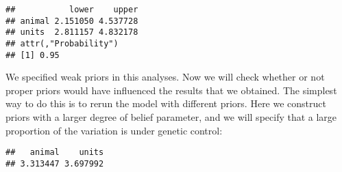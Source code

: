 \documentclass[
  12pt,
]{book}
\newenvironment{Shaded}{\begin{snugshade}}{\end{snugshade}}
\newcommand{\AttributeTok}[1]{\textcolor[rgb]{0.77,0.63,0.00}{#1}}
\newcommand{\ConstantTok}[1]{\textcolor[rgb]{0.00,0.00,0.00}{#1}}
\newcommand{\DecValTok}[1]{\textcolor[rgb]{0.00,0.00,0.81}{#1}}
\newcommand{\FloatTok}[1]{\textcolor[rgb]{0.00,0.00,0.81}{#1}}
\newcommand{\FunctionTok}[1]{\textcolor[rgb]{0.00,0.00,0.00}{#1}}
\newcommand{\NormalTok}[1]{#1}
\newcommand{\OtherTok}[1]{\textcolor[rgb]{0.56,0.35,0.01}{#1}}
\newcommand{\SpecialCharTok}[1]{\textcolor[rgb]{0.00,0.00,0.00}{#1}}
\begin{document}
\begin{verbatim}
##           lower    upper
## animal 2.151050 4.537728
## units  2.811157 4.832178
## attr(,"Probability")
## [1] 0.95
\end{verbatim}

We specified weak priors in this analyses. Now we will check whether or not proper priors would have influenced the results that we obtained. The simplest way to do this is to rerun the model with different priors. Here we construct priors with a larger degree of belief parameter, and we will specify that a large proportion of the variation is under genetic control:

\begin{Shaded}
\end{Shaded}

\begin{verbatim}
##   animal    units 
## 3.313447 3.697992
\end{verbatim}
\end{document}
